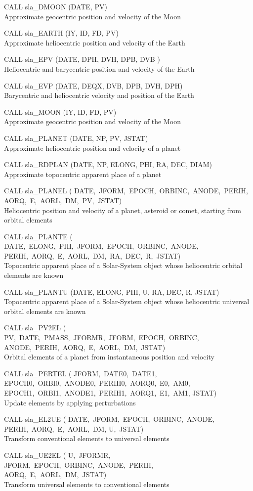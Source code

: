 \documentclass[11pt,twoside]{article}
\newcommand{\callhead}[1]{\goodbreak\vspace{\bigskipamount}{\large\bf{#1}}}
\newenvironment{callset}{\begin{list}{}{\setlength{\leftmargin}{2cm}
                             \setlength{\parsep}{\smallskipamount}}}{\end{list}}
\newcommand{\subp}[1]{\item\hspace{-1cm}#1\\}
\begin{document}
\callhead{Ephemerides}
\begin{callset}
\subp{CALL sla\_DMOON (DATE, PV)}
   Approximate geocentric position and velocity of the Moon
\subp{CALL sla\_EARTH (IY, ID, FD, PV)}
   Approximate heliocentric position and velocity of the Earth
\subp{CALL sla\_EPV (DATE, DPH, DVH, DPB, DVB )}
   Heliocentric and barycentric position and velocity of the Earth
\subp{CALL sla\_EVP (DATE, DEQX, DVB, DPB, DVH, DPH)}
   Barycentric and heliocentric velocity and position of the Earth
\subp{CALL sla\_MOON (IY, ID, FD, PV)}
   Approximate geocentric position and velocity of the Moon
\subp{CALL sla\_PLANET (DATE, NP, PV, JSTAT)}
   Approximate heliocentric position and velocity of a planet
\subp{CALL sla\_RDPLAN (DATE, NP, ELONG, PHI, RA, DEC, DIAM)}
   Approximate topocentric apparent place of a planet
\subp{CALL sla\_PLANEL (\vtop
                       {\hbox{DATE, JFORM, EPOCH, ORBINC, ANODE, PERIH,}
                      \hbox{AORQ, E, AORL, DM, PV, JSTAT)}}}
   Heliocentric position and velocity of a planet, asteroid or
   comet, starting from orbital elements
\subp{CALL sla\_PLANTE (\vtop
                       {\hbox{DATE, ELONG, PHI, JFORM, EPOCH, ORBINC, ANODE,}
                      \hbox{PERIH, AORQ, E, AORL, DM, RA, DEC, R, JSTAT)}}}
   Topocentric apparent place of a Solar-System object whose
   heliocentric orbital elements are known
\subp{CALL sla\_PLANTU (DATE, ELONG, PHI, U, RA, DEC, R, JSTAT)}
   Topocentric apparent place of a Solar-System object whose
   heliocentric universal orbital elements are known
\subp{CALL sla\_PV2EL (\vtop
                      {\hbox{PV, DATE, PMASS, JFORMR, JFORM, EPOCH, ORBINC,}
                     \hbox{ANODE, PERIH, AORQ, E, AORL, DM, JSTAT)}}}
   Orbital elements of a planet from instantaneous position and velocity
\subp{CALL sla\_PERTEL (\vtop
                       {\hbox{JFORM, DATE0, DATE1,}
                     \hbox{EPOCH0, ORBI0, ANODE0, PERIH0, AORQ0, E0, AM0,}
                     \hbox{EPOCH1, ORBI1, ANODE1, PERIH1, AORQ1, E1, AM1,}
                     \hbox{JSTAT)}}}
   Update elements by applying perturbations
\subp{CALL sla\_EL2UE (\vtop
                      {\hbox{DATE, JFORM, EPOCH, ORBINC, ANODE,}
                     \hbox{PERIH, AORQ, E, AORL, DM,}
                     \hbox{U, JSTAT)}}}
   Transform conventional elements to universal elements
\subp{CALL sla\_UE2EL (\vtop
                      {\hbox{U, JFORMR,}
                     \hbox{JFORM, EPOCH, ORBINC, ANODE, PERIH,}
                     \hbox{AORQ, E, AORL, DM, JSTAT)}}}
   Transform universal elements to conventional elements

\end{callset}
\end{document}
